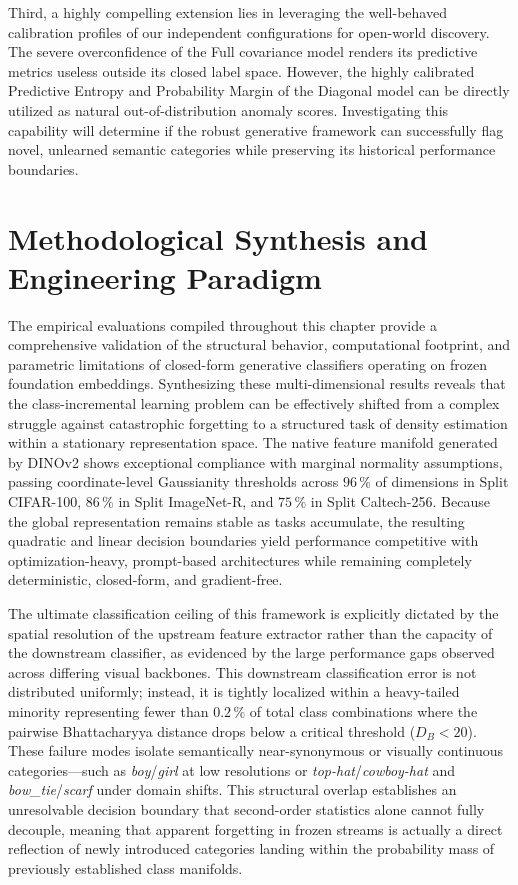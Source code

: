Third, a highly compelling extension lies in leveraging the well-behaved calibration profiles of our independent configurations for open-world discovery. The severe overconfidence of the Full covariance model renders its predictive metrics useless outside its closed label space. However, the highly calibrated Predictive Entropy and Probability Margin of the Diagonal model can be directly utilized as natural out-of-distribution anomaly scores. Investigating this capability will determine if the robust generative framework can successfully flag novel, unlearned semantic categories while preserving its historical performance boundaries.

\section{Methodological Synthesis and Engineering Paradigm}
\label{sec:an:summary}

The empirical evaluations compiled throughout this chapter provide a comprehensive validation of the structural behavior, computational footprint, and parametric limitations of closed-form generative classifiers operating on frozen foundation embeddings. Synthesizing these multi-dimensional results reveals that the class-incremental learning problem can be effectively shifted from a complex struggle against catastrophic forgetting to a structured task of density estimation within a stationary representation space. The native feature manifold generated by DINOv2 shows exceptional compliance with marginal normality assumptions, passing coordinate-level Gaussianity thresholds across $96\,\%$ of dimensions in Split CIFAR-100, $86\,\%$ in Split ImageNet-R, and $75\,\%$ in Split Caltech-256. Because the global representation remains stable as tasks accumulate, the resulting quadratic and linear decision boundaries yield performance competitive with optimization-heavy, prompt-based architectures while remaining completely deterministic, closed-form, and gradient-free.

The ultimate classification ceiling of this framework is explicitly dictated by the spatial resolution of the upstream feature extractor rather than the capacity of the downstream classifier, as evidenced by the large performance gaps observed across differing visual backbones. This downstream classification error is not distributed uniformly; instead, it is tightly localized within a heavy-tailed minority representing fewer than $0.2\,\%$ of total class combinations where the pairwise Bhattacharyya distance drops below a critical threshold ($D_B < 20$). These failure modes isolate semantically near-synonymous or visually continuous categories---such as \textit{boy}/\textit{girl} at low resolutions or \textit{top-hat}/\textit{cowboy-hat} and \textit{bow\_tie}/\textit{scarf} under domain shifts. This structural overlap establishes an unresolvable decision boundary that second-order statistics alone cannot fully decouple, meaning that apparent forgetting in frozen streams is actually a direct reflection of newly introduced categories landing within the probability mass of previously established class manifolds.

